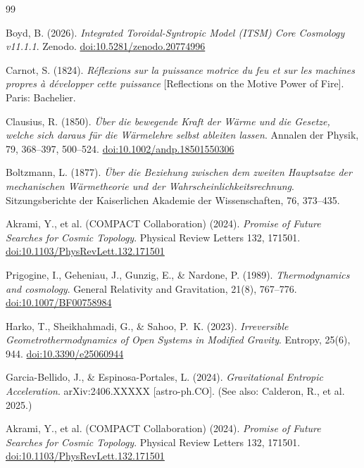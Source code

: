 \documentclass[aps,prd,11pt,onecolumn,superscriptaddress,nofootinbib,floatfix]{revtex4-2}
\begin{document}
\begin{thebibliography}{99}

Boyd, B. (2026). \textit{Integrated Toroidal-Syntropic Model (ITSM) Core Cosmology v11.1.1}. Zenodo. \href{https://doi.org/10.5281/zenodo.20774996}{doi:10.5281/zenodo.20774996}


Carnot, S. (1824). \textit{R\'eflexions sur la puissance motrice du feu et sur les machines propres \`a d\'evelopper cette puissance} [Reflections on the Motive Power of Fire]. Paris: Bachelier.

Clausius, R. (1850). \textit{\"Uber die bewegende Kraft der W\"arme und die Gesetze, welche sich daraus f\"ur die W\"armelehre selbst ableiten lassen}. Annalen der Physik, 79, 368--397, 500--524. \href{https://doi.org/10.1002/andp.18501550306}{doi:10.1002/andp.18501550306}

Boltzmann, L. (1877). \textit{\"Uber die Beziehung zwischen dem zweiten Hauptsatze der mechanischen W\"armetheorie und der Wahrscheinlichkeitsrechnung}. Sitzungsberichte der Kaiserlichen Akademie der Wissenschaften, 76, 373--435.

Akrami, Y., et al. (COMPACT Collaboration) (2024). \textit{Promise of Future Searches for Cosmic Topology}. Physical Review Letters 132, 171501. \href{https://doi.org/10.1103/PhysRevLett.132.171501}{doi:10.1103/PhysRevLett.132.171501}

Prigogine, I., Geheniau, J., Gunzig, E., \& Nardone, P. (1989). \textit{Thermodynamics and cosmology}. General Relativity and Gravitation, 21(8), 767--776. \href{https://doi.org/10.1007/BF00758984}{doi:10.1007/BF00758984}

Harko, T., Sheikhahmadi, G., \& Sahoo, P.~K. (2023). \textit{Irreversible Geometrothermodynamics of Open Systems in Modified Gravity}. Entropy, 25(6), 944. \href{https://doi.org/10.3390/e25060944}{doi:10.3390/e25060944}

Garcia-Bellido, J., \& Espinosa-Portales, L. (2024). \textit{Gravitational Entropic Acceleration}. arXiv:2406.XXXXX [astro-ph.CO]. (See also: Calderon, R., et al. 2025.)

Akrami, Y., et al. (COMPACT Collaboration) (2024). \textit{Promise of Future Searches for Cosmic Topology}. Physical Review Letters 132, 171501. \href{https://doi.org/10.1103/PhysRevLett.132.171501}{doi:10.1103/PhysRevLett.132.171501}


\end{thebibliography}
\end{document}
